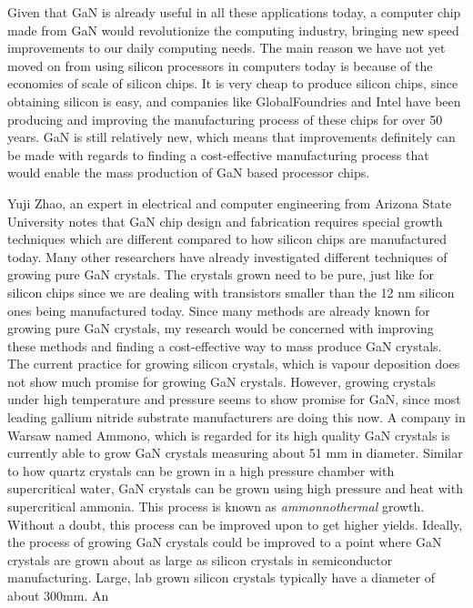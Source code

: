 \documentclass[letterpaper]{letter}
\begin{document}
\begin{letter}
Given that GaN is already useful in all these applications today, a
computer chip made from GaN would revolutionize the computing industry,
bringing new speed improvements to our daily computing needs. The main reason
we have not yet moved on from using silicon processors in computers today is
because of the economies of scale of silicon chips. It is very cheap to produce
silicon chips, since obtaining silicon is easy, and companies like
GlobalFoundries and Intel have been producing and improving the manufacturing
process of these chips for over 50 years. GaN is still relatively new,
which means that improvements definitely can be made with regards to finding a
cost-effective manufacturing process that would enable the mass production of GaN
based processor chips.


Yuji Zhao, an expert in electrical and computer engineering from Arizona State
University %
notes that GaN chip design and fabrication requires special growth techniques
which are different compared to how silicon chips are manufactured today. Many
other researchers have already investigated different techniques of growing pure
GaN crystals. The crystals grown need to be pure, just like for silicon chips
since we are dealing with transistors smaller than the 12 nm silicon ones being
manufactured today. Since many methods are already known for growing pure GaN
crystals, my research would be concerned with improving these methods and
finding a cost-effective way to mass produce GaN crystals. The current practice
for growing silicon crystals, which is vapour deposition does not show much
promise for growing GaN crystals. However, growing crystals under high
temperature and pressure seems to show promise for GaN, since most leading
gallium nitride substrate manufacturers are doing this now. A company in Warsaw
named Ammono, which is regarded for its high quality GaN crystals is currently
able to grow GaN crystals measuring about 51 mm in diameter. Similar to how
quartz crystals can be grown in a high pressure chamber with supercritical
water, GaN crystals can be grown using high pressure and heat with supercritical
ammonia. This process is known as \textit{ammonnothermal} growth. Without a
doubt, this process can be improved upon to get higher yields. Ideally, the
process of growing GaN crystals could be improved to a point where GaN crystals
are grown about as large as silicon crystals in semiconductor manufacturing.
Large, lab grown silicon crystals typically have a diameter of about 300mm. An

\end{letter}
\end{document}
